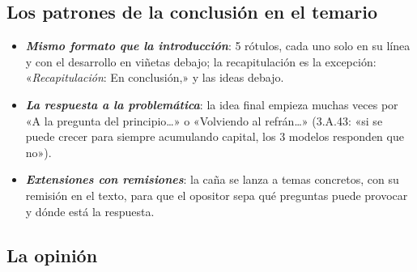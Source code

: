 \documentclass[11pt]{article}
\begin{document}
\begin{infografia}[!tb]
\end{infografia}

\subsection{Los patrones de la conclusión en el temario}\label{sec:patrones-conclusion}

\begin{itemize}
\item \textbf{\emph{Mismo formato que la introducción}}: 5 rótulos, cada uno solo en su línea y con el desarrollo en viñetas debajo; la recapitulación es la excepción: «\emph{Recapitulación}: En conclusión,» y las ideas debajo.
\item \textbf{\emph{La respuesta a la problemática}}: la idea final empieza muchas veces por «A la pregunta del principio…» o «Volviendo al refrán…» (3.A.43: «si se puede crecer para siempre acumulando capital, los 3 modelos responden que no»).
\item \textbf{\emph{Extensiones con remisiones}}: la caña se lanza a temas concretos, con su remisión en el texto, para que el opositor sepa qué preguntas puede provocar y dónde está la respuesta.
\end{itemize}


\subsection{La opinión}\label{sec:opinion}
\end{document}
